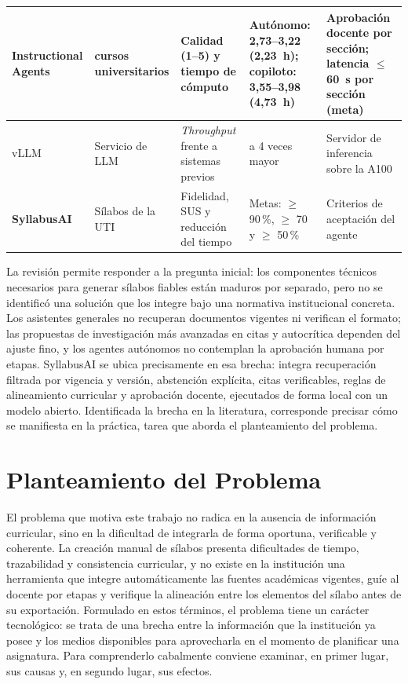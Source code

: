 \begin{table}[htbp]
\begin{tabular}{|>{\raggedright\arraybackslash}p{2.2cm}|>{\raggedright\arraybackslash}p{2.5cm}|>{\raggedright\arraybackslash}p{2.6cm}|>{\raggedright\arraybackslash}p{2.6cm}|>{\raggedright\arraybackslash}p{2.9cm}|}
    \hline
    Instructional Agents~\cite{yao2025instructional} & 5 cursos universitarios & Calidad (1--5) y tiempo de cómputo & Autónomo: 2,73--3,22 (2,23~h); copiloto: 3,55--3,98 (4,73~h) & Aprobación docente por sección; latencia $\leq$ 60~s por sección (meta) \\
    \hline
    vLLM~\cite{kwon2023vllm} & Servicio de LLM & \textit{Throughput} frente a sistemas previos & 2 a 4 veces mayor & Servidor de inferencia sobre la A100 \\
    \hline
    \textbf{SyllabusAI} & Sílabos de la UTI & Fidelidad, SUS y reducción del tiempo & Metas: $\geq$ 90\,\%, $\geq$ 70 y $\geq$ 50\,\% & Criterios de aceptación del agente \\
    \hline
  \end{tabular}
  \par\vspace{6pt}\normalsize\justifying
\end{table}

La revisión permite responder a la pregunta inicial: los componentes técnicos necesarios para generar sílabos fiables están maduros por separado, pero no se identificó una solución que los integre bajo una normativa institucional concreta. Los asistentes generales no recuperan documentos vigentes ni verifican el formato; las propuestas de investigación más avanzadas en citas y autocrítica dependen del ajuste fino, y los agentes autónomos no contemplan la aprobación humana por etapas. SyllabusAI se ubica precisamente en esa brecha: integra recuperación filtrada por vigencia y versión, abstención explícita, citas verificables, reglas de alineamiento curricular y aprobación docente, ejecutados de forma local con un modelo abierto. Identificada la brecha en la literatura, corresponde precisar cómo se manifiesta en la práctica, tarea que aborda el planteamiento del problema.

\section{Planteamiento del Problema}
El problema que motiva este trabajo no radica en la ausencia de información curricular, sino en la dificultad de integrarla de forma oportuna, verificable y coherente. La creación manual de sílabos presenta dificultades de tiempo, trazabilidad y consistencia curricular, y no existe en la institución una herramienta que integre automáticamente las fuentes académicas vigentes, guíe al docente por etapas y verifique la alineación entre los elementos del sílabo antes de su exportación. Formulado en estos términos, el problema tiene un carácter tecnológico: se trata de una brecha entre la información que la institución ya posee y los medios disponibles para aprovecharla en el momento de planificar una asignatura. Para comprenderlo cabalmente conviene examinar, en primer lugar, sus causas y, en segundo lugar, sus efectos.

